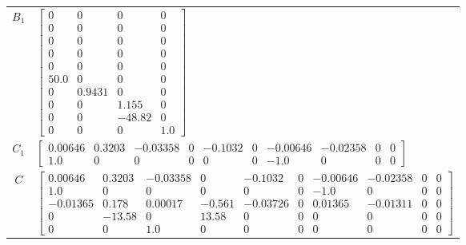 \begin{tabular}{cl}
 $B_{1}$  & $\left[\begin{matrix}0 & 0 & 0 & 0\\0 & 0 & 0 & 0\\0 & 0 & 0 & 0\\0 & 0 & 0 & 0\\0 & 0 & 0 & 0\\50.0 & 0 & 0 & 0\\0 & 0.9431 & 0 & 0\\0 & 0 & 1.155 & 0\\0 & 0 & -48.82 & 0\\0 & 0 & 0 & 1.0\end{matrix}\right]$                                                                                                                                                                                                                                                                                                                                                                                                    \\
 $C_{1}$  & $\left[\begin{matrix}0.00646 & 0.3203 & -0.03358 & 0 & -0.1032 & 0 & -0.00646 & -0.02358 & 0 & 0\\1.0 & 0 & 0 & 0 & 0 & 0 & -1.0 & 0 & 0 & 0\end{matrix}\right]$                                                                                                                                                                                                                                                                                                                                                                                                                                                    \\
   $C$    & $\left[\begin{matrix}0.00646 & 0.3203 & -0.03358 & 0 & -0.1032 & 0 & -0.00646 & -0.02358 & 0 & 0\\1.0 & 0 & 0 & 0 & 0 & 0 & -1.0 & 0 & 0 & 0\\-0.01365 & 0.178 & 0.00017 & -0.561 & -0.03726 & 0 & 0.01365 & -0.01311 & 0 & 0\\0 & -13.58 & 0 & 13.58 & 0 & 0 & 0 & 0 & 0 & 0\\0 & 0 & 1.0 & 0 & 0 & 0 & 0 & 0 & 0 & 0\end{matrix}\right]$                                                                                                                                                                                                                                                                          \\

\end{tabular}
